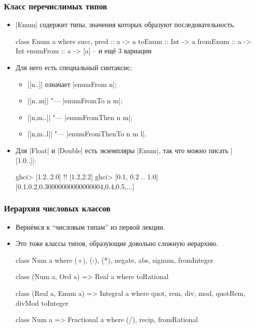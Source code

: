 \documentclass[10pt]{beamer}
\begin{document}
\begin{frame}[fragile]
  \frametitle{Класс перечислимых типов}
  \begin{itemize}
    \item
          \haskinline|Enum| содержит типы, значения которых образуют последовательность.
          \begin{haskell}
            class Enum a where
                succ, pred :: a -> a
                toEnum   :: Int -> a
                fromEnum :: a -> Int
                enumFrom :: a -> [a] -- и ещё 3 вариации
          \end{haskell}
          \pause
    \item Для него есть специальный синтаксис:
          \begin{itemize}
            \item \haskinline|[n..]| означает \haskinline|enumFrom n|;
            \item \haskinline|[n..m]| "--- \haskinline|enumFromTo n m|;
            \item \haskinline|[n,m..]| "--- \haskinline|enumFromThen n m|;
            \item \haskinline|[n,m..l]| "--- \haskinline|enumFromThenTo n m l|.
          \end{itemize}
          \pause
    \item Для \haskinline|Float| и \haskinline|Double| есть экземпляры \haskinline|Enum|, так что можно писать \haskinline|[1.0..]|:
          \begin{haskell}
            ghci> [1.2..2.0] !\pause!
            [1.2,2.2]
            ghci> [0.1, 0.2 .. 1.0]
            [0.1,0.2,0.30000000000000004,0.4,0.5,...]
          \end{haskell}
  \end{itemize}
\end{frame}

\begin{frame}[fragile]
  \frametitle{Иерархия числовых классов}
  \begin{itemize}
    \item Вернёмся к \enquote{числовым типам} из первой лекции.
    \item Это тоже классы типов, образующие довольно сложную иерархию.\pause
          \begin{haskell}
            class Num a where
                (+), (-), (*), negate, abs, signum, fromInteger

            class (Num a, Ord a) => Real a where
                toRational
                
            class (Real a, Enum a) => Integral a where
                quot, rem, div, mod, quotRem, divMod
                toInteger
                
            class Num a => Fractional a where
                (/), recip, fromRational    
          \end{haskell}
  \end{itemize}
\end{frame}
\end{document}
